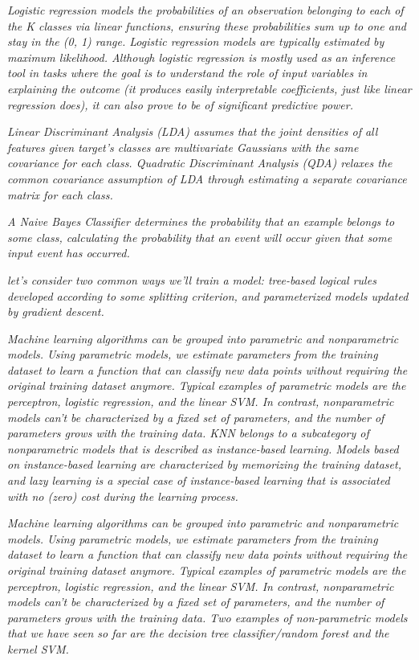 \textit{Logistic regression models the probabilities of an observation belonging to each of the K classes via linear functions, ensuring these probabilities sum up to one and stay in the (0, 1) range. Logistic regression models are typically estimated by maximum likelihood. Although logistic regression is mostly used as an inference tool in tasks where the goal is to understand the role of input variables in explaining the outcome (it produces easily interpretable coefficients, just like linear regression does), it can also prove to be of significant predictive power.}

\textit{Linear Discriminant Analysis (LDA) assumes that the joint densities of all features given target’s classes are multivariate Gaussians with the same covariance for each class. Quadratic Discriminant Analysis (QDA) relaxes the common covariance assumption of LDA through estimating a separate covariance matrix for each class.}

\textit{A Naive Bayes Classifier determines the probability that an example belongs to some class, calculating the probability that an event will occur given that some input event has occurred.}

\textit{let's consider two common ways we'll train a model: tree-based logical rules developed according to some splitting criterion, and parameterized models updated by gradient descent.}

\textit{Machine learning algorithms can be grouped into parametric and nonparametric models. Using parametric models, we estimate parameters from the training dataset to learn a function that can classify new data points without requiring the original training dataset anymore. Typical examples of parametric models are the perceptron, logistic regression, and the linear SVM. In contrast, nonparametric models can't be characterized by a fixed set of parameters, and the number of parameters grows with the training data. KNN belongs to a subcategory of nonparametric models that is described as instance-based learning. Models based on instance-based learning are characterized by memorizing the training dataset, and lazy learning is a special case of instance-based learning that is associated with no (zero) cost during the learning process.}

\textit{Machine learning algorithms can be grouped into parametric and nonparametric models. Using parametric models, we estimate parameters from the training dataset to learn a function that can classify new data points without requiring the original training dataset anymore. Typical examples of parametric models are the perceptron, logistic regression, and the linear SVM. In contrast, nonparametric models can't be characterized by a fixed set of parameters, and the number of parameters grows with the training data. Two examples of non-parametric models that we have seen so far are the decision tree classifier/random forest and the kernel SVM.}

